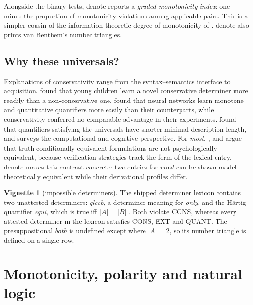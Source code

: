 \documentclass[11pt,a4paper]{article}
\newcommand{\dn}{\textsf{denote}}
\theoremstyle{definition}
\newtheorem{vignette}{Vignette}
\begin{document}
Alongside the binary tests, \dn{} reports a \emph{graded monotonicity index}: one minus the proportion of monotonicity violations among applicable pairs. This is a simpler cousin of the information-theoretic degree of monotonicity of \citet{carcassietal2021}. \dn{} also prints van Benthem's number triangles.

\subsection{Why these universals?}
Explanations of conservativity range from the syntax--semantics interface to acquisition. \citet{hunterlidz2013} found that young children learn a novel conservative determiner more readily than a non-conservative one. \citet{steinertthrelkeldszymanik2019} found that neural networks learn monotone and quantitative quantifiers more easily than their counterparts, while conservativity conferred no comparable advantage in their experiments. \citet{vandepoletal2023} found that quantifiers satisfying the universals have shorter minimal description length, and \citet{szymanik2016} surveys the computational and cognitive perspective. For \textit{most}, \citet{hackl2009}, \citet{pietroskietal2009} and \citet{lidzetal2011} argue that truth-conditionally equivalent formulations are not psychologically equivalent, because verification strategies track the form of the lexical entry. \dn{} makes this contrast concrete: two entries for \textit{most} can be shown model-theoretically equivalent while their derivational profiles differ.

\begin{vignette}[impossible determiners]\label{v:impossible}
The shipped determiner lexicon contains two unattested determiners: \textit{gleeb}, a determiner meaning for \textit{only}, and the H\"artig quantifier \textit{equi}, which is true iff $|A|=|B|$ \citep{hartig1965}. Both violate CONS, whereas every attested determiner in the lexicon satisfies CONS, EXT and QUANT. The presuppositional \textit{both} is undefined except where $|A|=2$, so its number triangle is defined on a single row.
\end{vignette}

\section{Monotonicity, polarity and natural logic}\label{sec:polarity}
\end{document}
